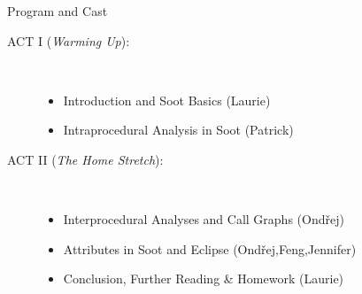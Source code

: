 \begin{slide}{Program and Cast}
\begin{description}
\item[ACT I ({\em Warming Up}):] \hspace{1in} \\
\begin{itemize}
\item Introduction and Soot Basics {\blue (Laurie)}
\item Intraprocedural Analysis in Soot {\blue (Patrick)}
\end{itemize}
\item[ACT II ({\em The Home Stretch}):] \hspace{1in} \\
\begin{itemize}
\item Interprocedural Analyses and Call Graphs {\blue (Ond\v{r}ej)}
\item {\red Attributes in Soot and Eclipse {\blue (Ond\v{r}ej,Feng,Jennifer)}}
\item Conclusion, Further Reading \& Homework {\blue (Laurie)}
\end{itemize}
\end{description}
\end{slide}




